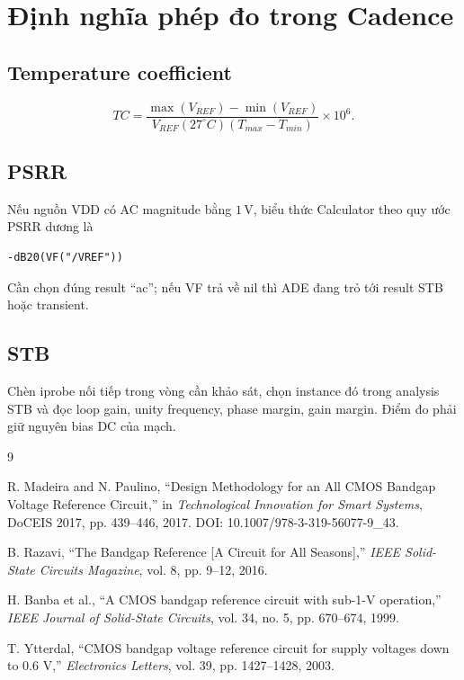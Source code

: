 \documentclass[11pt,a4paper]{report}
\newcommand{\SI}[2]{\ensuremath{#1\,\mathrm{#2}}}
\begin{document}
\appendix
\chapter{Định nghĩa phép đo trong Cadence}

\section{Temperature coefficient}
\begin{equation}
TC=\frac{\max(V_{REF})-\min(V_{REF})}
{V_{REF}(27^{\circ}C)(T_{max}-T_{min})}\times10^6.
\end{equation}

\section{PSRR}
Nếu nguồn VDD có AC magnitude bằng \SI{1}{V}, biểu thức Calculator theo quy
ước PSRR dương là
\begin{verbatim}
-dB20(VF("/VREF"))
\end{verbatim}
Cần chọn đúng result ``ac''; nếu VF trả về nil thì ADE đang trỏ tới result STB
hoặc transient.

\section{STB}
Chèn iprobe nối tiếp trong vòng cần khảo sát, chọn instance đó trong analysis
STB và đọc loop gain, unity frequency, phase margin, gain margin. Điểm đo phải
giữ nguyên bias DC của mạch.

\begin{thebibliography}{9}

R. Madeira and N. Paulino,
``Design Methodology for an All CMOS Bandgap Voltage Reference Circuit,''
in \emph{Technological Innovation for Smart Systems}, DoCEIS 2017,
pp. 439--446, 2017. DOI: 10.1007/978-3-319-56077-9\_43.

B. Razavi,
``The Bandgap Reference [A Circuit for All Seasons],''
\emph{IEEE Solid-State Circuits Magazine}, vol. 8, pp. 9--12, 2016.

H. Banba et al.,
``A CMOS bandgap reference circuit with sub-1-V operation,''
\emph{IEEE Journal of Solid-State Circuits}, vol. 34, no. 5,
pp. 670--674, 1999.

T. Ytterdal,
``CMOS bandgap voltage reference circuit for supply voltages down to 0.6 V,''
\emph{Electronics Letters}, vol. 39, pp. 1427--1428, 2003.

\end{thebibliography}
\end{document}
